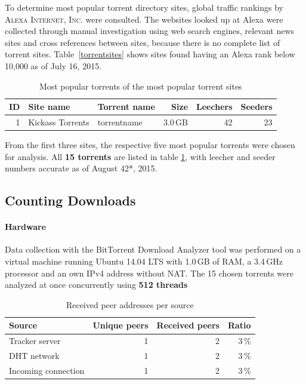 \documentclass[10pt, a4paper]{scrartcl} %
\renewcommand{\_}{\origunderscore\allowbreak}
\begin{document}
To determine most popular torrent directory sites, global traffic rankings by \textsc{Alexa Internet, Inc.} \cite{alexa} were consulted. The websites looked up at Alexa were collected through manual investigation using web search engines, relevant news sites and cross references between sites, because there is no complete list of torrent sites. Table~\ref{torrentsites} shows sites found having an Alexa rank below 10,000 as of July 16, 2015.

\begin{table}
\centering
\begin{tabular}{rllrrr}
\toprule
ID & Site name & Torrent name & Size & Leechers & Seeders \\
\midrule
1 & Kickass Torrents & torrent\_name & 3.0\,GB & 42 & 23 \\
\bottomrule
\end{tabular}
\caption{Most popular torrents of the most popular torrent sites}
\label{torrents}
\end{table}

From the first three sites, the respective five most popular torrents were chosen for analysis. All \textbf{15 torrents} are listed in table \ref{torrents}, with leecher and seeder numbers accurate as of August 42*, 2015.

\subsection{Counting Downloads}
\paragraph{Hardware}
Data collection with the BitTorrent Download Analyzer tool was performed on a virtual machine running Ubuntu 14.04 LTS with 1.0\,GB of RAM, a 3.4\,GHz processor and an own IPv4 address without NAT. The 15 chosen torrents were analyzed at once concurrently using \textbf{512 threads}

\begin{table}
\centering
\begin{tabular}{lrrr}
\toprule
Source & Unique peers & Received peers & Ratio \\
\midrule
Tracker server & 1 & 2 & 3\,\% \\
DHT network & 1 & 2 & 3\,\% \\
Incoming connection & 1 & 2 & 3\,\% \\
\bottomrule
\end{tabular}
\caption{Received peer addresses per source}
\label{unique-peers}
\end{table}
\end{document}
